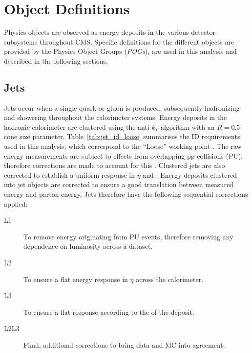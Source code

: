 \chapter{Object Definitions}
\label{ch:objects}

\ifpdf
    \graphicspath{{Chapter4/Figs/Raster/}{Chapter4/Figs/PDF/}{Chapter4/Figs/}}
\else
    \graphicspath{{Chapter4/Figs/Vector/}{Chapter4/Figs/}}
\fi



Physics objects are observed as energy deposits in the various detector 
subsystems throughout CMS. Specific definitions for the different 
objects are provided by the Physics Object Groups (\emph{POGs}), are used in
this analysis and described in the following sections.


\section{Jets}  %
\label{sec:objects_jets}

Jets occur when a single quark or gluon is produced, subsequently 
hadronizing and showering throughout the calorimeter systems. Energy deposits in
the hadronic calorimeter are clustered using the anti-$k_T$ algorithm \cite{antikt} with
an $R=0.5$ cone size parameter.
Table~\ref{tab:jet_id_loose} summarises the ID requirements used in this 
analysis, which correspond to the ``Loose'' working point \cite{ref:jet-id}.
The raw energy measurements are subject to 
effects from overlapping pp collisions (PU), therefore corrections are made to
account for this \cite{Cacciari2008119, 1126-6708-2008-04-005}. Clustered jets 
are also corrected to establish a uniform response in $\eta$ and \Pt
\cite{Chatrchyan:2011ds}.
Energy deposits clustered into jet objects are corrected to ensure a
good translation between measured energy and parton energy.
Jets therefore have the following sequential corrections \cite{ref:jet-jes}
\cite{2011JInst...611002C} applied:
\begin{description}
\item[L1] To remove energy originating from PU events, therefore removing any
dependence on luminosity across a dataset.
\item[L2] To ensure a flat energy response in $\eta$ across the calorimeter.
\item[L3] To ensure a flat response according to the \Pt of the deposit.
\item[L2L3] Final, additional corrections to bring data and MC into agreement.
\end{description}


